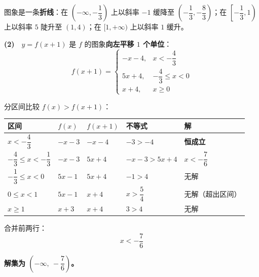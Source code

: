 图象是一条\textbf{折线}：在 $\left(-\infty,-\dfrac13\right)$ 上以斜率 $-1$ 缓降至 $\left(-\dfrac13,-\dfrac83\right)$；在 $\left[-\dfrac13,1\right)$ 上以斜率 $5$ 陡升至 $(1,4)$；在 $[1,+\infty)$ 上以斜率 $1$ 缓升。

\textbf{(2)}　$y=f(x+1)$ 是 $f$ 的图象\textbf{向左平移 $1$ 个单位}：
\[f(x+1)=\begin{cases}-x-4,&x<-\dfrac43\\[2mm] 5x+4,&-\dfrac43\le x<0\\[2mm] x+4,&x\ge0\end{cases}\]

分区间比较 $f(x)>f(x+1)$：

\begin{center}
\begin{tabular}{lllll}
\toprule
区间 & $f(x)$ & $f(x+1)$ & 不等式 & 解 \\
\midrule
$x<-\dfrac43$ & $-x-3$ & $-x-4$ & $-3>-4$ & \textbf{恒成立} \\
$-\dfrac43\le x<-\dfrac13$ & $-x-3$ & $5x+4$ & $-x-3>5x+4$ & $x<-\dfrac76$ \\
$-\dfrac13\le x<0$ & $5x-1$ & $5x+4$ & $-1>4$ & 无解 \\
$0\le x<1$ & $5x-1$ & $x+4$ & $x>\dfrac54$ & 无解（超出区间） \\
$x\ge1$ & $x+3$ & $x+4$ & $3>4$ & 无解 \\
\bottomrule
\end{tabular}
\end{center}

合并前两行：
\[x<-\frac76\]

\textbf{解集为 $\left(-\infty,\ -\dfrac76\right)$。}

